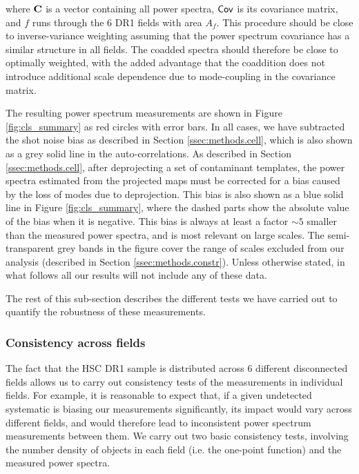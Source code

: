 \documentclass[a4paper,11pt]{article}
\begin{document}
      where ${\bf C}$ is a vector containing all power spectra, ${\sf Cov}$ is its covariance matrix, and $f$ runs through the 6 DR1 fields with area $A_f$. This procedure should be close to inverse-variance weighting assuming that the power spectrum covariance has a similar structure in all fields. The coadded spectra should therefore be close to optimally weighted, with the added advantage that the coaddition does not introduce additional scale dependence due to mode-coupling in the covariance matrix.
      
      The resulting power spectrum measurements are shown in Figure \ref{fig:cls_summary} as red circles with error bars. In all cases, we have subtracted the shot noise bias as described in Section \ref{ssec:methods.cell}, which is also shown as a grey solid line in the auto-correlations. As described in Section \ref{ssec:methods.cell}, after deprojecting a set of contaminant templates, the power spectra estimated from the projected maps must be corrected for a bias caused by the loss of modes due to deprojection. This bias is also shown as a blue solid line in Figure \ref{fig:cls_summary}, where the dashed parts show the absolute value of the bias when it is negative. This bias is always at least a factor $\sim5$ smaller than the measured power spectra, and is most relevant on large scales. The semi-transparent grey bands in the figure cover the range of scales excluded from our analysis (described in Section \ref{ssec:methods.constr}). Unless otherwise stated, in what follows all our results will not include any of these data.
      
      The rest of this sub-section describes the different tests we have carried out to quantify the robustness of these measurements.

    \subsubsection{Consistency across fields}\label{sssec:results.spectra.consistent}
      The fact that the HSC DR1 sample is distributed across 6 different disconnected fields allows us to carry out consistency tests of the measurements in individual fields. For example, it is reasonable to expect that, if a given undetected systematic is biasing our measurements significantly, its impact would vary across different fields, and would therefore lead to inconsistent power spectrum measurements between them. We carry out two basic consistency tests, involving the number density of objects in each field (i.e. the one-point function) and the measured power spectra.
      
\end{document}
